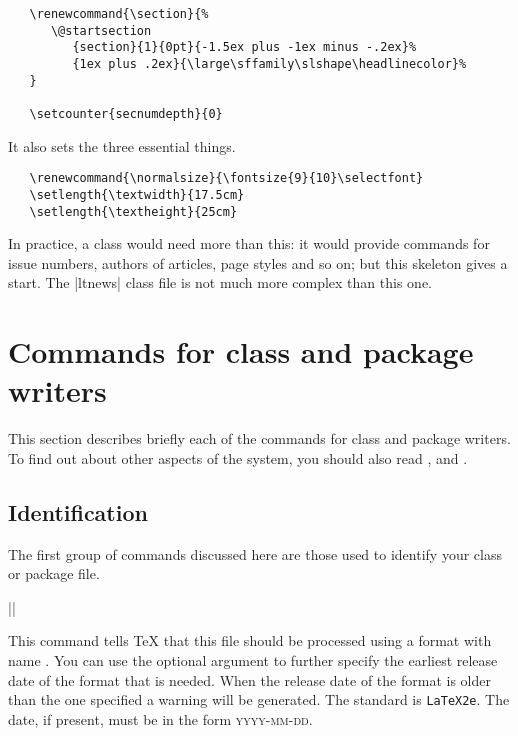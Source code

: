 \documentclass{ltxguide}
\begin{document}
\begin{verbatim}
   \renewcommand{\section}{%
      \@startsection
         {section}{1}{0pt}{-1.5ex plus -1ex minus -.2ex}%
         {1ex plus .2ex}{\large\sffamily\slshape\headlinecolor}%
   }

   \setcounter{secnumdepth}{0}
\end{verbatim}
It also sets the three essential things.
\begin{verbatim}
   \renewcommand{\normalsize}{\fontsize{9}{10}\selectfont}
   \setlength{\textwidth}{17.5cm}
   \setlength{\textheight}{25cm}
\end{verbatim}
In practice, a class would need more than this: it would provide commands for
issue numbers, authors of articles, page styles and so on; but this skeleton
gives a start. The |ltnews| class file is not much more complex than this one.

\section{Commands for class and package writers}
\label{Sec:commands}

This section describes briefly each of the commands for class and package
writers. To find out about other aspects of the system,
you should also read \emph{\LaTeXbook}, \emph{\LaTeXcomp} and
\emph{\usrguide}.

\subsection{Identification}

The first group of commands discussed here are those used to identify your
class or package file.

\begin{decl}
|\NeedsTeXFormat|  
\end{decl}
This command tells \TeX{} that this file should be processed using a format
with name . You can use the optional argument 
to further specify the earliest release date of the format that is needed. When
the release date of the format is older than the one specified a warning will
be generated. The standard  is \texttt{LaTeX2e}. The date, if
present, must be in the form \textsc{yyyy-mm-dd}.
\end{document}
